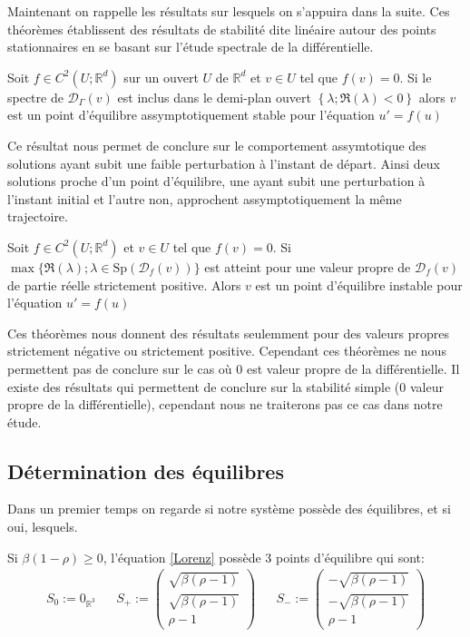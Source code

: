 \documentclass{article}
\newcommand*\colv[1]{
\left(\begin{array}{c}
    #1
\end{array}\right)
}
\newcommand{\R}{\mathbb{R}}
\newtheorem[M , nocut]{prop}{Proposition}[section]
\newtheorem[M , nocut]{definition}{Définition}
\newtheorem[M , nocut]{lemme}{Lemme}
\newtheorem[L , nocut]{thm}{Théoreme}
\newtheorem[M , nocut]{cor}{Corollaire}
\begin{document}
Maintenant on rappelle les résultats sur lesquels on s'appuira dans la suite. Ces théorèmes établissent des résultats de stabilité dite linéaire autour des points stationnaires en se basant sur l'étude spectrale de la différentielle.
\begin{thm}
    \label{thm:eq-ass-stable}
    Soit $f\in C^2(U;\R^d)$ sur un ouvert $U$ de $\R^d$ et $v\in U$ tel que $f(v)=0$. Si le spectre de $\mathcal{D}_\Gamma(v)$ est inclus dans le demi-plan ouvert $\left\{\lambda; \Re(\lambda)<0\right\}$ alors $v$ est un point d'équilibre assymptotiquement stable pour l'équation $u'=f(u)$
\end{thm}

Ce résultat nous permet de conclure sur le comportement assymtotique des solutions ayant subit une faible perturbation à l'instant de départ. Ainsi deux solutions proche d'un point d'équilibre, une ayant subit une perturbation à l'instant initial et l'autre non, approchent assymptotiquement la même trajectoire.

\begin{thm}
    \label{thm:eq-instable}
    Soit $f\in C^2(U;\R^d)$ et $v\in U$ tel que $f(v)=0$. Si $\max\{\Re(\lambda); \lambda\in \mathrm{Sp}(\mathcal{D}_f(v))\}$ est atteint pour une valeur propre de $\mathcal{D}_f(v)$ de partie réelle strictement positive. Alors $v$ est un point d'équilibre instable pour l'équation $u'=f(u)$
\end{thm}


Ces théorèmes nous donnent des résultats seulemment pour des valeurs propres strictement négative ou strictement positive. Cependant ces théorèmes ne nous permettent pas de conclure sur le cas où $0$ est valeur propre de la différentielle. Il existe des résultats qui permettent de conclure sur la stabilité simple ($0$ valeur propre de la différentielle), cependant nous ne traiterons pas ce cas dans notre étude.

\subsection{Détermination des équilibres}
Dans un premier temps on regarde si notre système possède des équilibres, et si oui, lesquels.
\begin{prop}
    Si $\beta(1-\rho) \ge 0$, l'équation \eqref{Lorenz} possède 3 points d'équilibre qui sont:
    \begin{align*}
        S_0 := 0_{\R^3} &&   S_+ :=\colv{\sqrt{ \beta (\rho -1)} \\ \sqrt{\beta (\rho -1)}\\ \rho -1}  &&  S_- := \colv{-\sqrt{ \beta (\rho -1)} \\ - \sqrt{\beta (\rho -1)}\\ \rho -1}
    \end{align*}
\end{prop}
\end{document}
